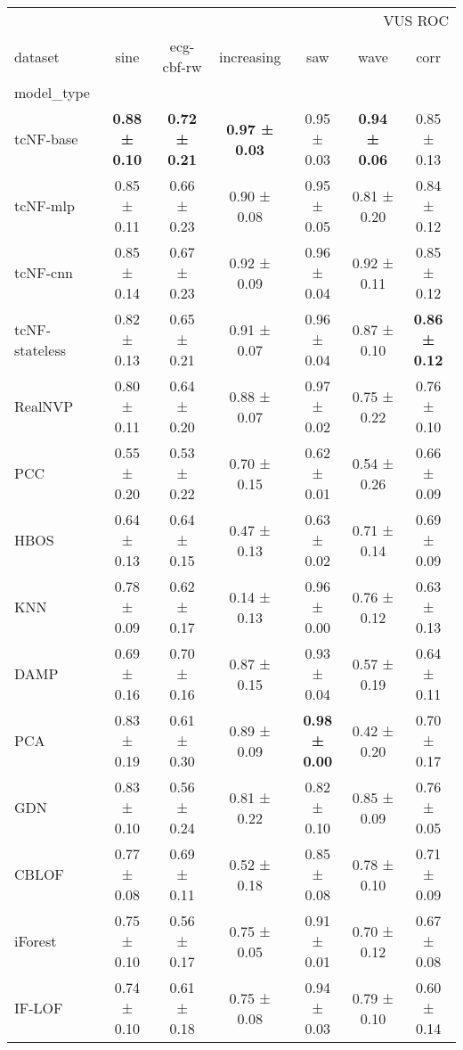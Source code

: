 \begin{tabular}{lcccccc}
\toprule
 & \multicolumn{6}{r}{VUS ROC} \\
dataset & sine & ecg-cbf-rw & increasing & saw & wave & corr \\
model_type &  &  &  &  &  &  \\
\midrule
tcNF-base & \bfseries 0.88 ± 0.10 & \bfseries 0.72 ± 0.21 & \bfseries 0.97 ± 0.03 & 0.95 ± 0.03 & \bfseries 0.94 ± 0.06 & 0.85 ± 0.13 \\
tcNF-mlp & 0.85 ± 0.11 & 0.66 ± 0.23 & 0.90 ± 0.08 & 0.95 ± 0.05 & 0.81 ± 0.20 & 0.84 ± 0.12 \\
tcNF-cnn & 0.85 ± 0.14 & 0.67 ± 0.23 & 0.92 ± 0.09 & 0.96 ± 0.04 & 0.92 ± 0.11 & 0.85 ± 0.12 \\
tcNF-stateless & 0.82 ± 0.13 & 0.65 ± 0.21 & 0.91 ± 0.07 & 0.96 ± 0.04 & 0.87 ± 0.10 & \bfseries 0.86 ± 0.12 \\
RealNVP & 0.80 ± 0.11 & 0.64 ± 0.20 & 0.88 ± 0.07 & 0.97 ± 0.02 & 0.75 ± 0.22 & 0.76 ± 0.10 \\
PCC & 0.55 ± 0.20 & 0.53 ± 0.22 & 0.70 ± 0.15 & 0.62 ± 0.01 & 0.54 ± 0.26 & 0.66 ± 0.09 \\
HBOS & 0.64 ± 0.13 & 0.64 ± 0.15 & 0.47 ± 0.13 & 0.63 ± 0.02 & 0.71 ± 0.14 & 0.69 ± 0.09 \\
KNN & 0.78 ± 0.09 & 0.62 ± 0.17 & 0.14 ± 0.13 & 0.96 ± 0.00 & 0.76 ± 0.12 & 0.63 ± 0.13 \\
DAMP & 0.69 ± 0.16 & 0.70 ± 0.16 & 0.87 ± 0.15 & 0.93 ± 0.04 & 0.57 ± 0.19 & 0.64 ± 0.11 \\
PCA & 0.83 ± 0.19 & 0.61 ± 0.30 & 0.89 ± 0.09 & \bfseries 0.98 ± 0.00 & 0.42 ± 0.20 & 0.70 ± 0.17 \\
GDN & 0.83 ± 0.10 & 0.56 ± 0.24 & 0.81 ± 0.22 & 0.82 ± 0.10 & 0.85 ± 0.09 & 0.76 ± 0.05 \\
CBLOF & 0.77 ± 0.08 & 0.69 ± 0.11 & 0.52 ± 0.18 & 0.85 ± 0.08 & 0.78 ± 0.10 & 0.71 ± 0.09 \\
iForest & 0.75 ± 0.10 & 0.56 ± 0.17 & 0.75 ± 0.05 & 0.91 ± 0.01 & 0.70 ± 0.12 & 0.67 ± 0.08 \\
IF-LOF & 0.74 ± 0.10 & 0.61 ± 0.18 & 0.75 ± 0.08 & 0.94 ± 0.03 & 0.79 ± 0.10 & 0.60 ± 0.14 \\
\bottomrule
\end{tabular}
